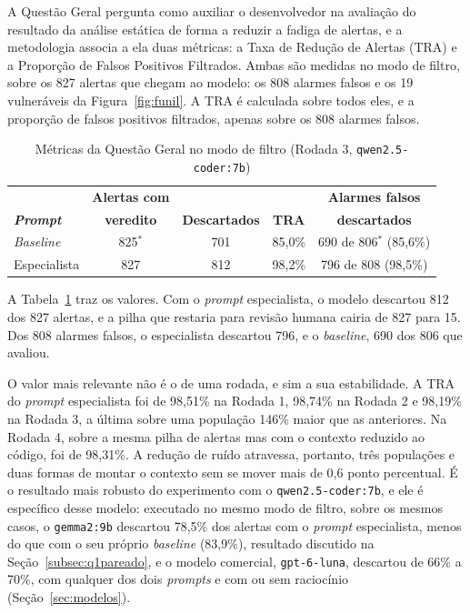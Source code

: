 A Questão Geral pergunta como auxiliar o desenvolvedor na avaliação do resultado da análise estática de forma a reduzir a fadiga de alertas, e a metodologia associa a ela duas métricas: a Taxa de Redução de Alertas (TRA) e a Proporção de Falsos Positivos Filtrados. Ambas são medidas no modo de filtro, sobre os 827 alertas que chegam ao modelo: os 808 alarmes falsos e os 19 vulneráveis da Figura~\ref{fig:funil}. A TRA é calculada sobre todos eles, e a proporção de falsos positivos filtrados, apenas sobre os 808 alarmes falsos.

\begin{table}[htpb]
    \centering
    \caption[Métricas da Questão Geral]{Métricas da Questão Geral no modo de filtro (Rodada 3, \texttt{qwen2.5-coder:7b})}
    \label{tab:geral}
    \renewcommand{\arraystretch}{1.4}
    \begin{tabular}{|l|c|c|c|c|}
        \hline
         & \textbf{Alertas com} & & & \textbf{Alarmes falsos} \\
        \textbf{\textit{Prompt}} & \textbf{veredito} & \textbf{Descartados} & \textbf{TRA} & \textbf{descartados} \\
        \hline
        \textit{Baseline} & 825$^{*}$ & 701 & 85,0\% & 690 de 806$^{*}$ (85,6\%) \\
        \hline
        Especialista & 827 & 812 & 98,2\% & 796 de 808 (98,5\%) \\
        \hline
    \end{tabular}
    \par{}
    \fontepesquisa
\end{table}

A Tabela~\ref{tab:geral} traz os valores. Com o \textit{prompt} especialista, o modelo descartou 812 dos 827 alertas, e a pilha que restaria para revisão humana cairia de 827 para 15. Dos 808 alarmes falsos, o especialista descartou 796, e o \textit{baseline}, 690 dos 806 que avaliou.

O valor mais relevante não é o de uma rodada, e sim a sua estabilidade. A TRA do \textit{prompt} especialista foi de 98,51\% na Rodada 1, 98,74\% na Rodada 2 e 98,19\% na Rodada 3, a última sobre uma população 146\% maior que as anteriores. Na Rodada 4, sobre a mesma pilha de alertas mas com o contexto reduzido ao código, foi de 98,31\%. A redução de ruído atravessa, portanto, três populações e duas formas de montar o contexto sem se mover mais de 0,6 ponto percentual. É o resultado mais robusto do experimento com o \texttt{qwen2.5-coder:7b}, e ele é específico desse modelo: executado no mesmo modo de filtro, sobre os mesmos casos, o \texttt{gemma2:9b} descartou 78,5\% dos alertas com o \textit{prompt} especialista, menos do que com o seu próprio \textit{baseline} (83,9\%), resultado discutido na Seção~\ref{subsec:q1pareado}, e o modelo comercial, \texttt{gpt-6-luna}, descartou de 66\% a 70\%, com qualquer dos dois \textit{prompts} e com ou sem raciocínio (Seção~\ref{sec:modelos}).

